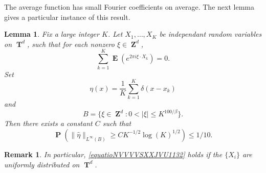 \documentclass[12pt,reqno]{article}
\numberwithin{equation}{section}
\DeclareMathOperator{\ZZ}{\mathbf{Z}}
\DeclareMathOperator{\TT}{\mathbf{T}}
\newtheorem{lemma}[theorem]{Lemma}
\newtheorem{remark}[theorem]{Remark}
\numberwithin{theorem}{section}
\DeclareMathOperator{\EE}{\mathbf{E}}
\DeclareMathOperator{\PP}{\mathbf{P}}
\begin{document}
The average function has small Fourier coefficients on average. The next lemma gives a particular instance of this result.

\begin{lemma} \label{LemmaGISCICS1}
    Fix a large integer $K$. Let $X_1, \dots, X_K$ be independant random variables on $\TT^d$, such that for each nonzero $\xi \in \ZZ^d$,
    \begin{equation} \label{equatioNVVVVSXXJVU1132}
        \sum_{k = 1}^K \EE \left( e^{2 \pi i \xi \cdot X_k} \right) = 0.
    \end{equation}
    Set
    \[ \eta(x) = \frac{1}{K} \sum_{k = 1}^K \delta(x - x_k) \]
    and
    \[ B = \{ \xi \in \ZZ^d: 0 < |\xi| \leq K^{100/\beta} \}. \]
    Then there exists a constant $C$ such that%
    \[ \PP \left( \| \widehat{\eta} \|_{L^\infty(B)} \geq C K^{-1/2} \log(K)^{1/2} \right) \leq 1/10. \]
\end{lemma}

\begin{remark}
    In particular, \eqref{equatioNVVVVSXXJVU1132} holds if the $\{ X_i \}$ are uniformly distributed on $\TT^d$.
\end{remark}
\end{document}
